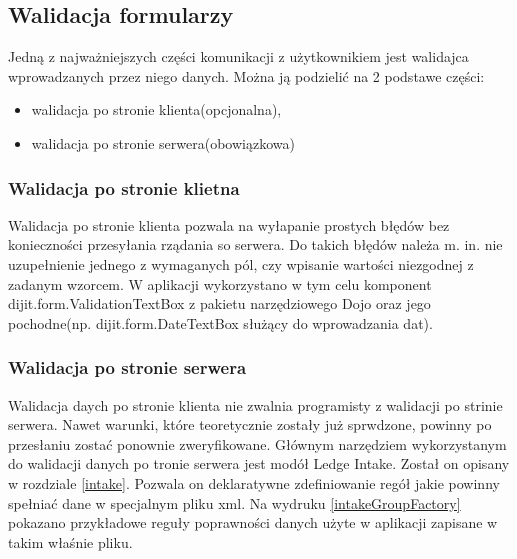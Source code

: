 \subsection[Walidacja formularzy][Walidacja formularzy]{Walidacja formularzy}
Jedną z najważniejszych części komunikacji z użytkownikiem jest walidajca wprowadzanych przez niego danych. Można ją podzielić na 2 podstawe części:
\begin{itemize}
	\item walidacja po stronie klienta(opcjonalna),
	\item walidacja po stronie serwera(obowiązkowa)
\end{itemize}

\subsubsection{Walidacja po stronie klietna}
Walidacja po stronie klienta pozwala na wyłapanie prostych błędów bez konieczności przesyłania rządania so serwera. Do takich błędów należa m. in. nie uzupełnienie jednego z wymaganych pól, czy wpisanie wartości niezgodnej z zadanym wzorcem. W aplikacji wykorzystano w tym celu komponent dijit.form.ValidationTextBox z pakietu narzędziowego Dojo oraz jego pochodne(np. dijit.form.DateTextBox służący do wprowadzania dat).

\subsubsection{Walidacja po stronie serwera}
Walidacja daych po stronie klienta nie zwalnia programisty z walidacji po strinie serwera. Nawet warunki, które teoretycznie zostały już sprwdzone, powinny po przesłaniu zostać ponownie zweryfikowane. Głównym narzędziem wykorzystanym do walidacji danych po tronie serwera jest modół Ledge Intake. Został on opisany w rozdziale \ref{intake}. Pozwala on deklaratywne zdefiniowanie regół jakie powinny spełniać dane w specjalnym pliku xml. Na wydruku \ref{intakeGroupFactory} pokazano przykładowe reguły poprawności danych użyte w aplikacji zapisane w takim właśnie pliku.

